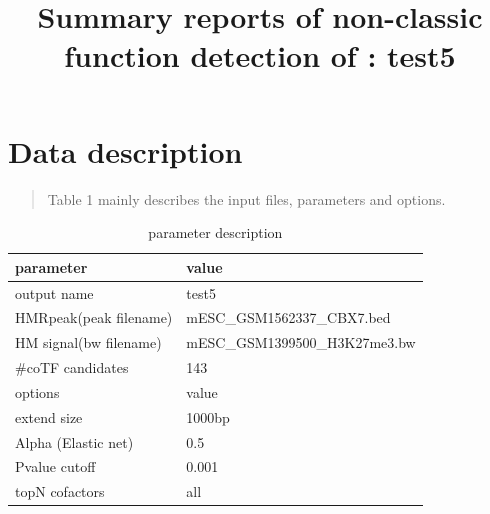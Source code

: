 \documentclass[11pt,a4paper]{article}
\begin{document}
\title{Summary reports of non-classic function detection of : test5}

\vspace{-1cm}
\maketitle
\tableofcontents
\newpage
\newpage
\section{Data description}
\begin{quotation}
Table 1 mainly describes the input files, parameters and options.
\end{quotation}
\begin{table}[h]
\caption{parameter description}\label{bstable}
\begin{tabularx}{\textwidth}{ |X|l| }

      
\hline
parameter & value  \\
\hline
output name & test5 \\
\hline
HMRpeak(peak filename) & mESC\_GSM1562337\_CBX7.bed \\
\hline
HM signal(bw filename) & mESC\_GSM1399500\_H3K27me3.bw  \\
\hline
\#coTF candidates & 143 \\
\hline
options & value \\
\hline
extend size & 1000bp \\
\hline
Alpha (Elastic net) & 0.5 \\
\hline
Pvalue cutoff & 0.001 \\
\hline
topN cofactors & all \\
\hline

\end{tabularx}
\end{table}

\newpage
\newpage
\end{document}
